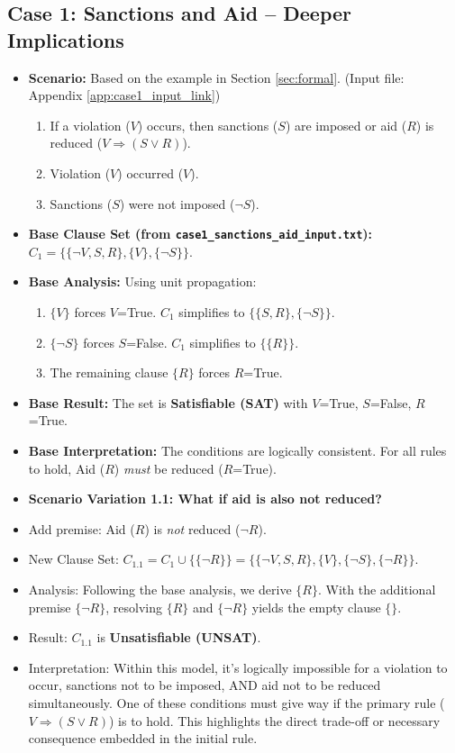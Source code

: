\documentclass[11pt, a4paper]{article}
\begin{document}
\subsection*{Case 1: Sanctions and Aid – Deeper Implications}
\begin{itemize}
    \item \textbf{Scenario:} Based on the example in Section \ref{sec:formal}. (Input file: Appendix \ref{app:case1_input_link})
    \begin{enumerate}
        \item If a violation ($V$) occurs, then sanctions ($S$) are imposed or aid ($R$) is reduced ($V \Rightarrow (S \vee R)$).
        \item Violation ($V$) occurred ($V$).
        \item Sanctions ($S$) were not imposed ($\neg S$).
    \end{enumerate}
    \item \textbf{Base Clause Set (from \texttt{case1\_sanctions\_aid\_input.txt}):} $C_1 = \{\{\neg V, S, R\}, \{V\}, \{\neg S\}\}$.
    \item \textbf{Base Analysis:} Using unit propagation:
    \begin{enumerate}
        \item $\{V\}$ forces $V$=True. $C_1$ simplifies to $\{\{S, R\}, \{\neg S\}\}$.
        \item $\{\neg S\}$ forces $S$=False. $C_1$ simplifies to $\{\{R\}\}$.
        \item The remaining clause $\{R\}$ forces $R$=True.
    \end{enumerate}
    \item \textbf{Base Result:} The set is \textbf{Satisfiable (SAT)} with $V$=True, $S$=False, $R$=True.
    \item \textbf{Base Interpretation:} The conditions are logically consistent. For all rules to hold, Aid ($R$) \textit{must} be reduced ($R$=True).

    \item \textbf{Scenario Variation 1.1: What if aid is also not reduced?}
        \item Add premise: Aid ($R$) is \textit{not} reduced ($\neg R$).
        \item New Clause Set: $C_{1.1} = C_1 \cup \{\{\neg R\}\} = \{\{\neg V, S, R\}, \{V\}, \{\neg S\}, \{\neg R\}\}$.
        \item Analysis: Following the base analysis, we derive $\{R\}$. With the additional premise $\{\neg R\}$, resolving $\{R\}$ and $\{\neg R\}$ yields the empty clause $\{\}$.
        \item Result: $C_{1.1}$ is \textbf{Unsatisfiable (UNSAT)}.
        \item Interpretation: Within this model, it's logically impossible for a violation to occur, sanctions not to be imposed, AND aid not to be reduced simultaneously. One of these conditions must give way if the primary rule ($V \Rightarrow (S \vee R)$) is to hold. This highlights the direct trade-off or necessary consequence embedded in the initial rule.


\end{itemize}
\end{document}
